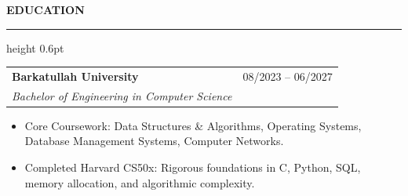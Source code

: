 \documentclass[10pt,letterpaper]{article}
\newcommand{\cvsection}[1]{%
  \vspace{5pt}
  {\fontsize{11}{13}\bfseries\color{awesome-emerald}\uppercase{#1}}
  \vspace{-2pt}
  {\color{awesome-lightgray}\hrule height 0.6pt}
  \vspace{3pt}
}
\begin{document}
\cvsection{Education}
\noindent\begin{tabular*}{\textwidth}{@{\extracolsep{\fill}}lr}
  \textbf{\color{awesome-dark} Barkatullah University} & {\color{awesome-gray}\small 08/2023 -- 06/2027} \\
  \textit{\color{awesome-emerald} Bachelor of Engineering in Computer Science} & {\color{awesome-gray}\small } \\
\end{tabular*}\vspace{-2pt}
\begin{itemize}
  \item Core Coursework: Data Structures \& Algorithms, Operating Systems, Database Management Systems, Computer Networks.
  \item Completed Harvard CS50x: Rigorous foundations in C, Python, SQL, memory allocation, and algorithmic complexity.
\end{itemize}\vspace{2pt}
\end{document}
